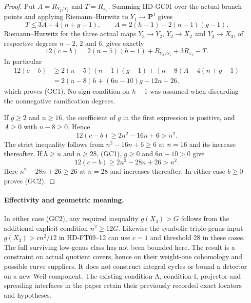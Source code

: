 \begin{proof}
Put $A=R_{Y_2/Y_1}$ and $T=R_{\pi_3}$. Summing HD-GC01 over the
actual branch points and applying Riemann--Hurwitz to
$Y_1\to\mathbf P^1$ gives
\[
       T\leq3A+4(n+g-1),\qquad
       A=2(h-1)-2(n-1)(g-1).
\]
Riemann--Hurwitz for the three actual maps
$Y_3\to Y_2$, $Y_2\to X_2$ and $Y_3\to X_3$, of respective
degrees $n-2$, $2$ and $6$, gives exactly
\[
 12(c-b)=2(n-5)(h-1)+R_{Y_3/Y_2}+3R_{\pi_2}-T.
\]
In particular
\[
 \begin{split}
 12(c-b)&\geq2(n-5)(n-1)(g-1)
                    +(n-8)A-4(n+g-1)\\
         &=2(n-8)h+(6n-10)g-12n+26,
 \end{split}
\]
which proves (GC1). No sign condition on $h-1$ was assumed when
discarding the nonnegative ramification degrees.

If $g\geq2$ and $n\geq16$, the coefficient of $g$ in the first
expression is positive, and $A\geq0$ with $n-8\geq0$. Hence
\[
       12(c-b)\geq2n^2-16n+6>n^2.
\]
The strict inequality follows from $n^2-16n+6\geq6$ at $n=16$
and its increase thereafter. If $h\geq n$ and $n\geq28$, (GC1),
$g\geq0$ and $6n-10>0$ give
\[
       12(c-b)\geq2n^2-28n+26>n^2.
\]
Here $n^2-28n+26\geq26$ at $n=28$ and increases thereafter.
In either case $b\geq0$ proves (GC2).
\end{proof}

\paragraph{Effectivity and geometric meaning.}
In either case (GC2), any required inequality $g(X_3)>G$ follows
from the additional explicit condition $n^2\geq12G$. Likewise the
symbolic triple-genus input $g(X_3)>cn^2/12$ in HD-FT09--12 can use
$c=1$ and threshold $28$ in these cases. The full surviving
low-genus class has not been bounded here. The result is a constraint
on actual quotient covers, hence on their weight-one cohomology and
possible curve suppliers. It does not construct integral cycles or
bound a detector on a new Weil component. The existing condition-A,
condition-I, projector and spreading interfaces in the paper retain
their previously recorded exact locators and hypotheses.
